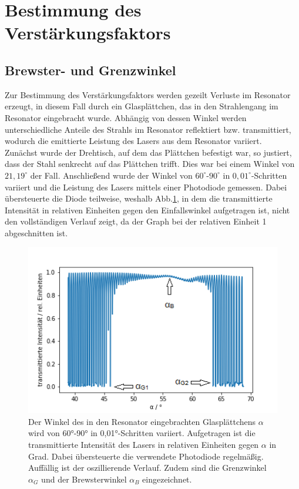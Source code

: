 
\section{Bestimmung des Verstärkungsfaktors}
\subsection{Brewster- und Grenzwinkel}

Zur Bestimmung des Verstärkungsfaktors werden gezeilt Verluste im Resonator erzeugt, in diesem Fall durch ein Glasplättchen, das in den Strahlengang im Resonator eingebracht 
wurde. Abhängig von dessen Winkel werden unterschiedliche Anteile des Strahls im Resonator reflektiert bzw. transmittiert, wodurch die emittierte Leistung des Lasers aus dem 
Resonator variiert. \\
Zunächst wurde der Drehtisch, auf dem das Plättchen befestigt war, so justiert, dass der Stahl senkrecht auf das Plättchen trifft. Dies war bei einem Winkel von $21,19^{\circ}$ der 
Fall. Anschließend wurde der Winkel von $60^{\circ}$-$90^{\circ}$ in $0,01^{\circ}$-Schritten variiert und die Leistung des Lasers mittels einer Photodiode gemessen. Dabei übersteuerte die Diode teilweise, 
weshalb Abb.\ref{plot:Talpha}, in dem die transmittierte Intensität in relativen Einheiten gegen den Einfallswinkel aufgetragen ist, nicht den vollständigen Verlauf zeigt, 
da der Graph bei der relativen Einheit 1 abgeschnitten ist. 

\begin{figure}[h]
    \centering
    \includegraphics[scale = 1.5]{Bilder/Auswertung/brewsterpfeil.png}
    \caption{Der Winkel des in den Resonator eingebrachten Glasplättchens $\alpha$ wird von 60°-90° in 0,01°-Schritten variiert. Aufgetragen ist die transmittierte Intensität 
    des Lasers in relativen Einheiten gegen $\alpha$ in Grad. Dabei übersteuerte die verwendete Photodiode regelmäßig. Auffällig ist der oszillierende Verlauf. 
    Zudem sind die Grenzwinkel $\alpha_G$ und der Brewsterwinkel $\alpha_B$ eingezeichnet.}
    \label{plot:Talpha}
\end{figure}

